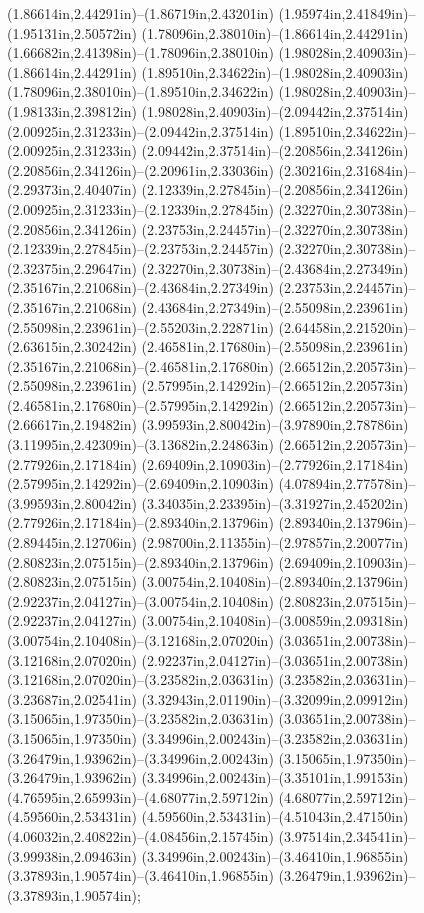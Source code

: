 (1.86614in,2.44291in)--(1.86719in,2.43201in) (1.95974in,2.41849in)--(1.95131in,2.50572in) (1.78096in,2.38010in)--(1.86614in,2.44291in) (1.66682in,2.41398in)--(1.78096in,2.38010in) (1.98028in,2.40903in)--(1.86614in,2.44291in) (1.89510in,2.34622in)--(1.98028in,2.40903in) (1.78096in,2.38010in)--(1.89510in,2.34622in) (1.98028in,2.40903in)--(1.98133in,2.39812in) (1.98028in,2.40903in)--(2.09442in,2.37514in) (2.00925in,2.31233in)--(2.09442in,2.37514in) (1.89510in,2.34622in)--(2.00925in,2.31233in) (2.09442in,2.37514in)--(2.20856in,2.34126in) (2.20856in,2.34126in)--(2.20961in,2.33036in) (2.30216in,2.31684in)--(2.29373in,2.40407in) (2.12339in,2.27845in)--(2.20856in,2.34126in) (2.00925in,2.31233in)--(2.12339in,2.27845in) (2.32270in,2.30738in)--(2.20856in,2.34126in) (2.23753in,2.24457in)--(2.32270in,2.30738in) (2.12339in,2.27845in)--(2.23753in,2.24457in) (2.32270in,2.30738in)--(2.32375in,2.29647in) (2.32270in,2.30738in)--(2.43684in,2.27349in) (2.35167in,2.21068in)--(2.43684in,2.27349in) (2.23753in,2.24457in)--(2.35167in,2.21068in) (2.43684in,2.27349in)--(2.55098in,2.23961in) (2.55098in,2.23961in)--(2.55203in,2.22871in) (2.64458in,2.21520in)--(2.63615in,2.30242in) (2.46581in,2.17680in)--(2.55098in,2.23961in) (2.35167in,2.21068in)--(2.46581in,2.17680in) (2.66512in,2.20573in)--(2.55098in,2.23961in) (2.57995in,2.14292in)--(2.66512in,2.20573in) (2.46581in,2.17680in)--(2.57995in,2.14292in) (2.66512in,2.20573in)--(2.66617in,2.19482in) (3.99593in,2.80042in)--(3.97890in,2.78786in) (3.11995in,2.42309in)--(3.13682in,2.24863in) (2.66512in,2.20573in)--(2.77926in,2.17184in) (2.69409in,2.10903in)--(2.77926in,2.17184in) (2.57995in,2.14292in)--(2.69409in,2.10903in) (4.07894in,2.77578in)--(3.99593in,2.80042in) (3.34035in,2.23395in)--(3.31927in,2.45202in) (2.77926in,2.17184in)--(2.89340in,2.13796in) (2.89340in,2.13796in)--(2.89445in,2.12706in) (2.98700in,2.11355in)--(2.97857in,2.20077in) (2.80823in,2.07515in)--(2.89340in,2.13796in) (2.69409in,2.10903in)--(2.80823in,2.07515in) (3.00754in,2.10408in)--(2.89340in,2.13796in) (2.92237in,2.04127in)--(3.00754in,2.10408in) (2.80823in,2.07515in)--(2.92237in,2.04127in) (3.00754in,2.10408in)--(3.00859in,2.09318in) (3.00754in,2.10408in)--(3.12168in,2.07020in) (3.03651in,2.00738in)--(3.12168in,2.07020in) (2.92237in,2.04127in)--(3.03651in,2.00738in) (3.12168in,2.07020in)--(3.23582in,2.03631in) (3.23582in,2.03631in)--(3.23687in,2.02541in) (3.32943in,2.01190in)--(3.32099in,2.09912in) (3.15065in,1.97350in)--(3.23582in,2.03631in) (3.03651in,2.00738in)--(3.15065in,1.97350in) (3.34996in,2.00243in)--(3.23582in,2.03631in) (3.26479in,1.93962in)--(3.34996in,2.00243in) (3.15065in,1.97350in)--(3.26479in,1.93962in) (3.34996in,2.00243in)--(3.35101in,1.99153in) (4.76595in,2.65993in)--(4.68077in,2.59712in) (4.68077in,2.59712in)--(4.59560in,2.53431in) (4.59560in,2.53431in)--(4.51043in,2.47150in) (4.06032in,2.40822in)--(4.08456in,2.15745in) (3.97514in,2.34541in)--(3.99938in,2.09463in) (3.34996in,2.00243in)--(3.46410in,1.96855in) (3.37893in,1.90574in)--(3.46410in,1.96855in) (3.26479in,1.93962in)--(3.37893in,1.90574in);
